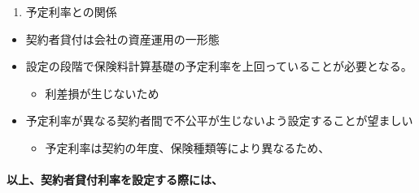 \documentclass[]{article}
\begin{document}
\begin{enumerate}
\def\labelenumi{\arabic{enumi}.}
\setcounter{enumi}{1}
\tightlist
\item
  予定利率との関係
\end{enumerate}

\begin{itemize}
\tightlist
\item
  契約者貸付は会社の資産運用の一形態
\item
  設定の段階で保険料計算基礎の予定利率を上回っていることが必要となる。

  \begin{itemize}
  \tightlist
  \item
    利差損が生じないため
  \end{itemize}
\item
  予定利率が異なる契約者間で不公平が生じないよう設定することが望ましい

  \begin{itemize}
  \tightlist
  \item
    予定利率は契約の年度、保険種類等により異なるため、
  \end{itemize}
\end{itemize}

\hypertarget{ux4ee5ux4e0aux5951ux7d04ux8005ux8cb8ux4ed8ux5229ux7387ux3092ux8a2dux5b9aux3059ux308bux969bux306bux306f}{%
\paragraph{以上、契約者貸付利率を設定する際には、}\label{ux4ee5ux4e0aux5951ux7d04ux8005ux8cb8ux4ed8ux5229ux7387ux3092ux8a2dux5b9aux3059ux308bux969bux306bux306f}}
\end{document}
